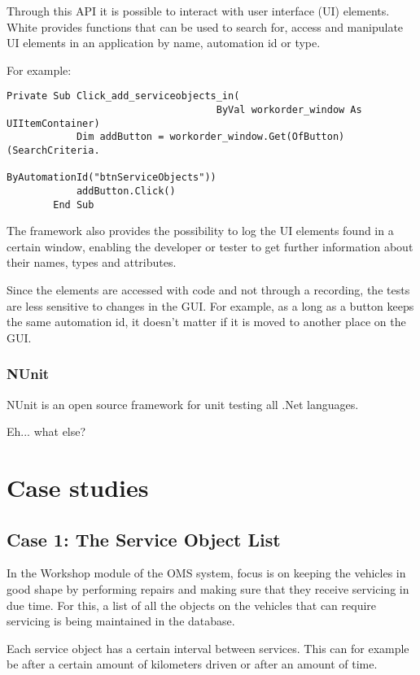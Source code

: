 \documentclass{article}
\begin{document}
			Through this API it is possible to interact with user interface (UI) elements. 
			White provides functions that can be used to search for, access and manipulate UI elements in an application by name, automation id or type. 

			For example:

			\begin{lstlisting}[caption=A method which finds a button with id {\em btnServiceObjects} and clicks on it.]
		Private Sub Click_add_serviceobjects_in(
									ByVal workorder_window As UIItemContainer)
			Dim addButton = workorder_window.Get(OfButton)(SearchCriteria.
												ByAutomationId("btnServiceObjects"))
			addButton.Click()
		End Sub
			\end{lstlisting}
			
			The framework also provides the possibility to log the UI elements found in a certain window, enabling the developer or tester to get further information about their names, types and attributes.

			Since the elements are accessed with code and not through a recording, the tests are less sensitive to changes in the GUI. For example, as a long as a button keeps the same automation id, it doesn't matter if it is moved to another place on the GUI. 

			\subsubsection{NUnit}
			NUnit is an open source framework for unit testing all .Net languages. \cite{nunit}

			Eh... what else?


	\section{Case studies}
		\subsection{Case 1: The Service Object List}
		In the Workshop module of the OMS system, focus is on keeping the vehicles in good shape by performing repairs and making sure that they receive servicing in due time. For this, a list of all the objects on the vehicles that can require servicing is being maintained in the database. 

		Each service object has a certain interval between services. This can for example be after a certain amount of kilometers driven or after an amount of time. 
\end{document}
